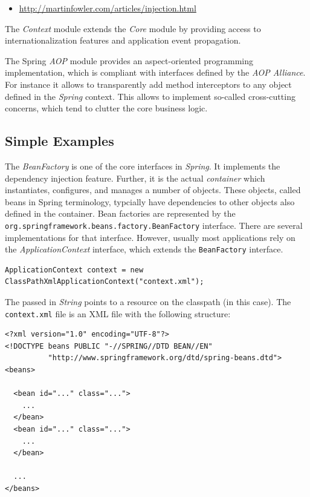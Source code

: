 \begin{itemize}
 \item \href{http://martinfowler.com/articles/injection.html}{http://martinfowler.com/articles/injection.html}
\end{itemize}

The \emph{Context} module extends the \emph{Core} module by providing access
to internationalization features and application event propagation.

The Spring \emph{AOP} module provides an aspect-oriented programming 
implementation, which is compliant with interfaces defined by the 
\emph{AOP Alliance}. For instance it allows to transparently add method
interceptors to any object defined in the \emph{Spring} context. This allows
to implement so-called cross-cutting concerns, which tend to clutter the
core business logic.


\subsection{Simple Examples}

The \emph{BeanFactory} is one of the core interfaces in \emph{Spring}. It
implements the dependency injection feature. Further, it is the actual
\emph{container} which instantiates, configures, and manages a number of
objects. These objects, called beans in Spring terminology, typcially have
dependencies to other objects also defined in the container. Bean factories
are represented by the \texttt{org.springframework.beans.factory.BeanFactory}
interface. There are several implementations for that interface. However,
usually most applications rely on the \emph{ApplicationContext} interface, which
extends the \texttt{BeanFactory} interface.

\begin{verbatim}
ApplicationContext context = new ClassPathXmlApplicationContext("context.xml");
\end{verbatim}

The passed in \emph{String} points to a resource on the classpath (in this 
case). The \texttt{context.xml} file is an XML file with the following
structure:

\small{\begin{verbatim}
<?xml version="1.0" encoding="UTF-8"?>
<!DOCTYPE beans PUBLIC "-//SPRING//DTD BEAN//EN" 
          "http://www.springframework.org/dtd/spring-beans.dtd">
<beans>
  
  <bean id="..." class="...">
    ...
  </bean>
  <bean id="..." class="...">
    ...
  </bean>

  ...
</beans>
\end{verbatim}}

